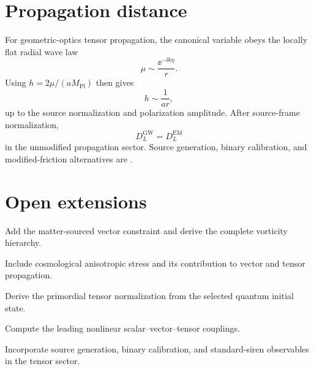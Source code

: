\section{Propagation distance}
For geometric-optics tensor propagation, the canonical variable obeys the locally flat radial wave law
\begin{equation}
\mu\sim\frac{\ee^{-\ii k\eta}}{r}.
\end{equation}
Using \(h=2\mu/(aM_{\mathrm{Pl}})\) then gives
\begin{equation}
h\sim\frac{1}{ar},
\end{equation}
up to the source normalization and polarization amplitude.
After source-frame normalization,
\begin{equation}
D_L^{\mathrm{GW}}=D_L^{\mathrm{EM}}
\end{equation}
in the unmodified propagation sector. Source generation, binary calibration, and modified-friction alternatives are .

\section{Open extensions}
\begin{nextsteps}
\item Add the matter-sourced vector constraint and derive the complete vorticity hierarchy.
\item Include cosmological anisotropic stress and its contribution to vector and tensor propagation.
\item Derive the primordial tensor normalization from the selected quantum initial state.
\item Compute the leading nonlinear scalar--vector--tensor couplings.
\item Incorporate source generation, binary calibration, and standard-siren observables in the tensor sector.
\end{nextsteps}
